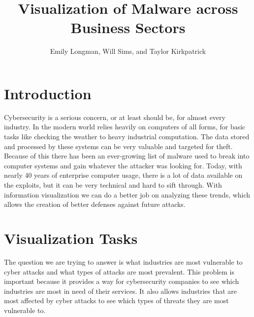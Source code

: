\documentclass[journal]{vgtc}                %
\title{Visualization of Malware across Business Sectors}
\author{Emily Longman, Will Sims, and Taylor Kirkpatrick}
\begin{document}


\maketitle

\section*{Introduction} %
Cybersecurity is a serious concern, or at least should be, for almost every industry.
In the modern world relies heavily on computers of all forms, for basic tasks like checking the weather to heavy industrial computation.
The data stored and processed by these systems can be very valuable and targeted for theft.
Because of this there has been an ever-growing list of malware used to break into computer systems and gain whatever the attacker was looking for.
Today, with nearly 40 years of enterprise computer usage, there is a lot of data available on the exploits, but it can be very technical and hard to sift through. 
With information visualization we can do a better job on analyzing these trends, which allows the creation of better defenses against future attacks.

\section{Visualization Tasks}
The question we are trying to answer is what industries are most vulnerable to cyber attacks and what types of attacks are most prevalent. 
This problem is important because it provides a way for cybersecurity companies to see which industries are most in need of their services. 
It also allows industries that are most affected by cyber attacks to see which types of threats they are most vulnerable to.
\end{document}
